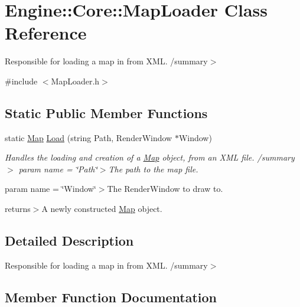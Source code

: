 \hypertarget{class_engine_1_1_core_1_1_map_loader}{}\section{Engine\+:\+:Core\+:\+:Map\+Loader Class Reference}
\label{class_engine_1_1_core_1_1_map_loader}


Responsible for loading a map in from X\+ML. /summary$>$  




{\ttfamily \#include $<$Map\+Loader.\+h$>$}

\subsection*{Static Public Member Functions}
\begin{DoxyCompactItemize}
\item 
static \hyperlink{class_engine_1_1_core_1_1_map}{Map} \hyperlink{class_engine_1_1_core_1_1_map_loader_a32e2582da2a0173435e6508c3b23434b}{Load} (string Path, Render\+Window $\ast$Window)
\begin{DoxyCompactList}\small\item\em Handles the loading and creation of a \hyperlink{class_engine_1_1_core_1_1_map}{Map} object, from an X\+ML file. /summary$>$ param name = \char`\"{}\+Path\char`\"{}$>$The path to the map file.

param name = \char`\"{}\+Window\char`\"{}$>$The Render\+Window to draw to.

returns$>$A newly constructed \hyperlink{class_engine_1_1_core_1_1_map}{Map} object.\end{DoxyCompactList}\end{DoxyCompactItemize}


\subsection{Detailed Description}
Responsible for loading a map in from X\+ML. /summary$>$ 

\subsection{Member Function Documentation}
\mbox{\label{class_engine_1_1_core_1_1_map_loader_a32e2582da2a0173435e6508c3b23434b}} 
